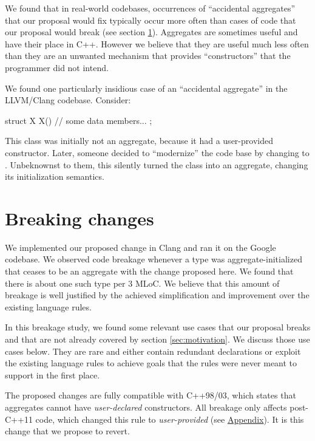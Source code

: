 We found that in real-world codebases, occurrences of ``accidental aggregates'' that our proposal would fix typically occur more often than cases of code that our proposal would break (see section \ref{sec:breakage}). Aggregates are sometimes useful and have their place in C++. However we believe that they are useful much less often than they are an unwanted mechanism that provides ``constructors'' that the programmer did not intend. 

We found one particularly insidious case of an ``accidental aggregate'' in the LLVM/Clang codebase. Consider:

\begin{codeblock}
struct X {
   X() {}
   // some data members...
};
\end{codeblock}

This class was initially not an aggregate, because it had a user-provided constructor. Later, someone decided to ``modernize'' the code base by changing  to . Unbeknownst to them, this silently turned the class into an aggregate, changing its initialization semantics.

\section{Breaking changes}
\label{sec:breakage}

We implemented our proposed change in Clang and ran it on the Google codebase. We observed code breakage whenever a type was aggregate-initialized that ceases to be an aggregate with the change proposed here. We found that there is about one such type per 3 MLoC. We believe that this amount of breakage is well justified by the achieved simplification and improvement over the existing language rules.

In this breakage study, we found some relevant use cases that our proposal breaks and that are not already covered by section \ref{sec:motivation}. We discuss those use cases below. They are rare and either contain redundant declarations or exploit the existing language rules to achieve goals that the rules were never meant to support in the first place.

The proposed changes are fully compatible with C++98/03, which states that aggregates cannot have \emph{user-declared} constructors. All breakage only affects post-C++11 code, which changed this rule to \emph{user-provided} (see \hyperref[appendix]{Appendix}). It is this change that we propose to revert.

